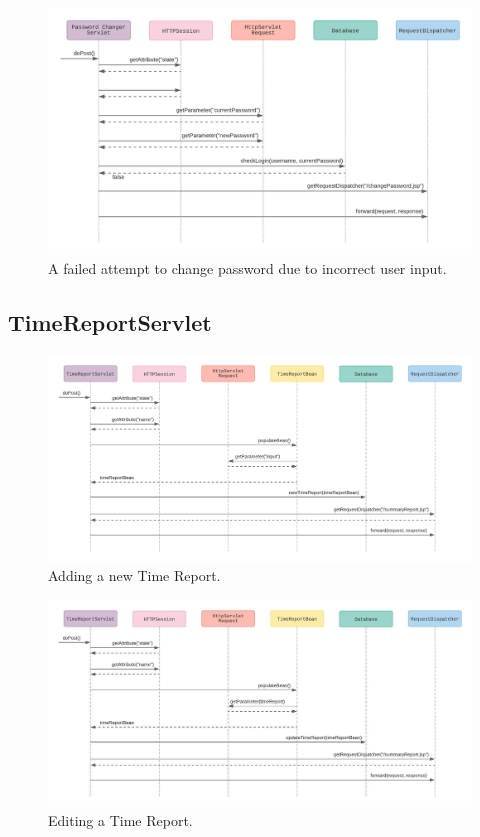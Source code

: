 \documentclass{article}
\begin{document}
\begin{figure}[H]
    \centering
    \includegraphics[scale=0.5]{images/changePasswordFalseInput.png}
    \caption{A failed attempt to change password due to incorrect user input.}
    \label{fig:failedPasswordChangeIncorrectInput}
\end{figure}

\pagebreak

\subsection{TimeReportServlet}

\begin{figure}[H]
    \centering
    \includegraphics[scale=0.5]{images/newTimeReport.png}
    \caption{Adding a new Time Report.}
    \label{fig:newTimeReport}
\end{figure}

\begin{figure}[H]
    \centering
    \includegraphics[scale=0.5]{images/editTimeReport.jpeg}
    \caption{Editing a Time Report.}
    \label{fig:editTimeReport}
\end{figure}
\end{document}

